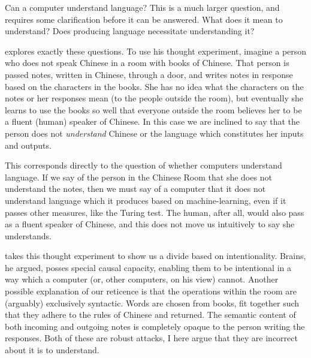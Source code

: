 \documentclass[man,floatsintext,12pt,natbib]{apa6}
\begin{document}
Can a computer understand language?
This is a much larger question, and requires some clarification before it can
be answered. What does it mean to understand? Does producing language
necessitate understanding it?

\citet{Searle80} explores exactly these questions. To use his thought
experiment, imagine a person who does not speak Chinese in a room with books of
Chinese. That person is passed notes, written in Chinese, through a door, and
writes notes in response based on the characters in the books. She has no idea
what the characters on the notes or her responses mean (to the people outside
the room), but eventually she learns to use the books so well that everyone
outside the room believes her to be a fluent (human) speaker of Chinese. In
this case we are inclined to say that the person does not \emph{understand}
Chinese or the language which constitutes her inputs and outputs.

This corresponds directly to the question of whether computers understand
language. If we say of the person in the Chinese Room that she does not
understand the notes, then we must say of a computer that it does not
understand language which it produces based on machine-learning, even if it
passes other measures, like the Turing test. The human, after all, would also
pass as a fluent speaker of Chinese, and this does not move us intuitively to
say she understands.

\citet{Searle80} takes this thought experiment to show us a divide based on
intentionality. Brains, he argued, posses special causal capacity, enabling
them to be intentional in a way which a computer (or, other computers, on his
view) cannot.
Another possible explanation of our reticence is that the operations within the
room are (arguably) exclusively syntactic\citep{Marconi96}. Words are chosen
from books, fit together such that they adhere to the rules of Chinese and
returned. The semantic content of both incoming and outgoing notes is
completely opaque to the person writing the responses.
Both of these are robust attacks, I here argue that they are incorrect about 
it is to understand.
\end{document}
